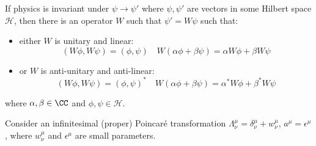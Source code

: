 \documentclass{jknotes}
\begin{document}
\begin{theorem}[Wigner]
    If physics is invariant under \(\psi\rightarrow\psi'\) where \(\psi,\psi'\) are vectors in some Hilbert space \(\mathcal{H}\), then there is an operator \(W\) such that \(\psi'=W\psi\) such that:
    \begin{itemize}
        \item either \(W\) is unitary and linear:
            \begin{equation}
                (W\phi,W\psi) = (\phi,\psi)
                \quad
                W(\alpha\phi + \beta\psi) = \alpha W\phi + \beta W\psi
            \end{equation}
        \item or \(W\) is anti-unitary and anti-linear:
            \begin{equation}
                (W\phi,W\psi) = (\phi,\psi)^*
                \quad
                W(\alpha\phi + \beta\psi) = \alpha^* W\phi + \beta^* W\psi
            \end{equation}
    \end{itemize}
    where \(\alpha,\beta\in\CC\) and \(\phi,\psi\in\mathcal{H}\).
\end{theorem}

Consider an infinitesimal (proper) Poincar\'e transformation \(\Lambda^\mu_\nu = \delta^\mu_\nu + w^\mu_\nu\), \(a^\mu = \epsilon^\mu\), where \(w^\mu_\nu\) and \(\epsilon^\mu\) are small parameters.
\end{document}
